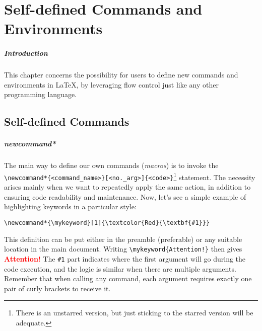 \chapter{Self-defined Commands and Environments}

\paragraph{Introduction}
This chapter concerns the possibility for users to define new commands and environments in \LaTeX{}, by leveraging flow control just like any other programming language.

\section{Self-defined Commands}

\paragraph{newcommand*}
The main way to define our own commands (\textit{macros}) is to invoke the \texttt{\textbackslash newcommand*\{<command\_name>\}[<no.\_arg>]\{<code>\}}\footnote{There is an unstarred version, but just sticking to the starred version will be adequate.} statement. The necessity arises mainly when we want to repeatedly apply the same action, in addition to ensuring code readability and maintenance. Now, let's see a simple example of highlighting keywords in a particular style:
\begin{lstlisting}
\newcommand*{\mykeyword}[1]{\textcolor{Red}{\textbf{#1}}}    
\end{lstlisting}
\newcommand*{\mykeyword}[1]{\textcolor{Red}{\textbf{#1}}}
This definition can be put either in the preamble (preferable) or any suitable location in the main document. Writing \texttt{\textbackslash mykeyword\{Attention!\}} then gives \mykeyword{Attention!} The \texttt{\#1} part indicates where the first argument will go during the code execution, and the logic is similar when there are multiple arguments. Remember that when calling any command, each argument requires exactly one pair of curly brackets to receive it.

